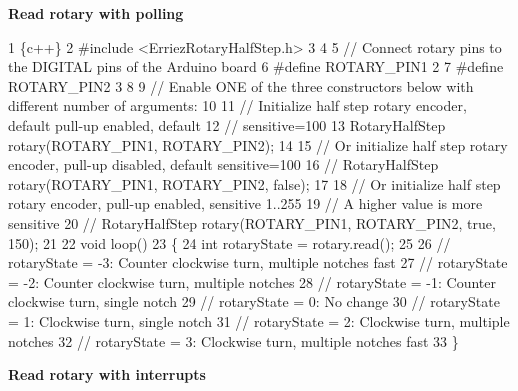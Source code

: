 {\bfseries Read rotary with polling} 
\begin{DoxyCode}
1 \{c++\}
2 #include <ErriezRotaryHalfStep.h>
3 
4 
5 // Connect rotary pins to the DIGITAL pins of the Arduino board
6 #define ROTARY\_PIN1   2
7 #define ROTARY\_PIN2   3
8 
9 // Enable ONE of the three constructors below with different number of arguments:
10 
11 // Initialize half step rotary encoder, default pull-up enabled, default 
12 // sensitive=100
13 RotaryHalfStep rotary(ROTARY\_PIN1, ROTARY\_PIN2);
14 
15 // Or initialize half step rotary encoder, pull-up disabled, default sensitive=100
16 // RotaryHalfStep rotary(ROTARY\_PIN1, ROTARY\_PIN2, false);
17 
18 // Or initialize half step rotary encoder, pull-up enabled, sensitive 1..255
19 // A higher value is more sensitive
20 // RotaryHalfStep rotary(ROTARY\_PIN1, ROTARY\_PIN2, true, 150);
21 
22 void loop()
23 \{
24   int rotaryState = rotary.read();
25 
26   // rotaryState = -3: Counter clockwise turn, multiple notches fast
27   // rotaryState = -2: Counter clockwise turn, multiple notches
28   // rotaryState = -1: Counter clockwise turn, single notch
29   // rotaryState = 0:  No change
30   // rotaryState = 1:  Clockwise turn, single notch
31   // rotaryState = 2:  Clockwise turn, multiple notches
32   // rotaryState = 3:  Clockwise turn, multiple notches fast
33 \}
\end{DoxyCode}


{\bfseries Read rotary with interrupts}


